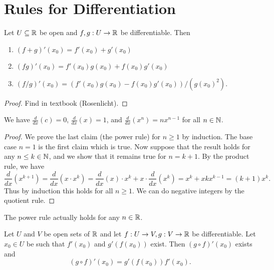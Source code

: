 \section{Rules for Differentiation}
\begin{prop}
  Let $U \subseteq \mathbb{R}$ be open and $f, g : U \to \mathbb{R}$
  be differentiable. Then
  \begin{enumerate}
    \item $(f + g)'(x_0) = f'(x_0) + g'(x_0)$
    \item $(fg)'(x_0) = f'(x_0)g(x_0) + f(x_0)g'(x_0)$
    \item $(f/g)'(x_0) = (f'(x_0)g(x_0) - f(x_0)g'(x_0)) / (g(x_0)^2)$.
  \end{enumerate}
\end{prop}

\begin{proof}
  Find in textbook (Rosenlicht).
\end{proof}

\begin{prop}
  We have $\frac{d}{dx}(c) = 0$, $\frac{d}{dx}(x) = 1$,
  and $\frac{d}{dx}(x^n) = nx^{n - 1}$ for all $n \in \mathbb{N}$.
\end{prop}

\begin{proof}
  We prove the last claim (the power rule) for
  $n \ge 1$ by induction. The base case
  $n = 1$ is the first claim which is true. Now suppose
  that the result holds for any $n \le k \in \mathbb{N}$, and
  we show that it remains true for $n = k + 1$. By
  the product rule, we have
  \[
    \frac{d}{dx} (x^{k + 1})
    = \frac{d}{dx} (x \cdot x^k)
    = \frac{d}{dx}(x) \cdot x^k + x \cdot \frac{d}{dx}(x^k) = x^k + xkx^{k - 1} = (k + 1)x^k.
  \]
  Thus by induction this holds for all $n \ge 1$.
  We can do negative integers by the quotient rule.
\end{proof}

\begin{remark}
  The power rule actually holds for any $n \in \mathbb{R}$.
\end{remark}

\begin{prop}
  Let $U$ and $V$ be open sets of $\mathbb{R}$ and let
  $f : U \to V, g : V \to \mathbb{R}$ be differentiable.
  Let $x_0 \in U$ be such that $f'(x_0)$ and
  $g'(f(x_0))$ exist. Then $(g \circ f)'(x_0)$ exists
  and
  \[(g \circ f)'(x_0) = g'(f(x_0)) f'(x_0).\]
\end{prop}

